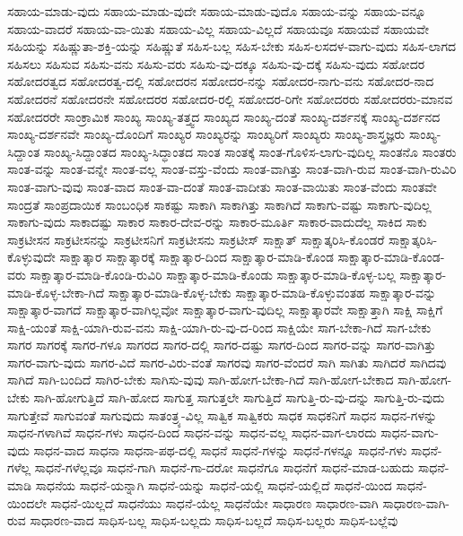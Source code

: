 {ಸಹಾಯ-ಮಾಡು-ವುದು
ಸಹಾಯ-ಮಾಡು-ವುದೇ
ಸಹಾಯ-ಮಾಡು-ವುದೊ
ಸಹಾಯ-ವನ್ನು
ಸಹಾಯ-ವನ್ನೂ
ಸಹಾಯ-ವಾದರೆ
ಸಹಾಯ-ವಾ-ಯಿತು
ಸಹಾಯ-ವಿಲ್ಲ
ಸಹಾಯ-ವಿಲ್ಲದೆ
ಸಹಾಯವೂ
ಸಹಾಯವೆ
ಸಹಾಯವೇ
ಸಹಿಯನ್ನು
ಸಹಿಷ್ಣುತಾ-ಶಕ್ತಿ-ಯನ್ನು
ಸಹಿಷ್ಣುತೆ
ಸಹಿಸ-ಬಲ್ಲ
ಸಹಿಸ-ಬೇಕು
ಸಹಿಸ-ಲಸದಳ-ವಾಗು-ವುದು
ಸಹಿಸ-ಲಾಗದ
ಸಹಿಸಲು
ಸಹಿಸುವ
ಸಹಿಸು-ವನು
ಸಹಿಸು-ವರು
ಸಹಿಸು-ವು-ದಕ್ಕೂ
ಸಹಿಸು-ವು-ದಕ್ಕೆ
ಸಹಿಸು-ವುದು
ಸಹೋದರ
ಸಹೋದರತ್ವದ
ಸಹೋದರತ್ವ-ದಲ್ಲಿ
ಸಹೋದರನ
ಸಹೋದರ-ನನ್ನು
ಸಹೋದರ-ನಾಗು-ವನು
ಸಹೋದರ-ನಾದ
ಸಹೋದರನೆ
ಸಹೋದರನೇ
ಸಹೋದರರ
ಸಹೋದರ-ರಲ್ಲಿ
ಸಹೋದರ-ರಿಗೇ
ಸಹೋದರರು
ಸಹೋದರರು-ಮಾನವ
ಸಹೋದರರೇ
ಸಾಂಕ್ರಾಮಿಕ
ಸಾಂಖ್ಯ
ಸಾಂಖ್ಯ-ತತ್ತ್ವದ
ಸಾಂಖ್ಯದ
ಸಾಂಖ್ಯ-ದಂತೆ
ಸಾಂಖ್ಯ-ದರ್ಶನಕ್ಕೆ
ಸಾಂಖ್ಯ-ದರ್ಶನದ
ಸಾಂಖ್ಯ-ದರ್ಶನವೇ
ಸಾಂಖ್ಯ-ದೊಂದಿಗೆ
ಸಾಂಖ್ಯರ
ಸಾಂಖ್ಯರನ್ನು
ಸಾಂಖ್ಯರಿಗೆ
ಸಾಂಖ್ಯರು
ಸಾಂಖ್ಯ-ಶಾಸ್ತ್ರಜ್ಞರು
ಸಾಂಖ್ಯ-ಸಿದ್ದಾಂತ
ಸಾಂಖ್ಯ-ಸಿದ್ದಾಂತದ
ಸಾಂಖ್ಯ-ಸಿದ್ಧಾಂತದ
ಸಾಂತ
ಸಾಂತಕ್ಕೆ
ಸಾಂತ-ಗೊಳಿಸ-ಲಾಗು-ವುದಿಲ್ಲ
ಸಾಂತನೊ
ಸಾಂತರು
ಸಾಂತ-ವನ್ನು
ಸಾಂತ-ವನ್ನೇ
ಸಾಂತ-ವಲ್ಲ
ಸಾಂತ-ವಸ್ತು-ವೆಂದು
ಸಾಂತ-ವಾಗಿತ್ತು
ಸಾಂತ-ವಾಗಿ-ರುವ
ಸಾಂತ-ವಾಗಿ-ರುವಿರಿ
ಸಾಂತ-ವಾಗು-ವುವು
ಸಾಂತ-ವಾದ
ಸಾಂತ-ವಾ-ದಂತೆ
ಸಾಂತ-ವಾದೀತು
ಸಾಂತ-ವಾಯಿತು
ಸಾಂತ-ವೆಂದು
ಸಾಂತವೇ
ಸಾಂದ್ರತೆ
ಸಾಂಪ್ರದಾಯಿಕ
ಸಾಂಬಂಧಿಕ
ಸಾಕಷ್ಟು
ಸಾಕಾಗಿ
ಸಾಕಾಗಿತ್ತು
ಸಾಕಾಗಿದೆ
ಸಾಕಾಗು-ವಷ್ಟು
ಸಾಕಾಗು-ವುದಿಲ್ಲ
ಸಾಕಾಗು-ವುದು
ಸಾಕಾದಷ್ಟು
ಸಾಕಾರ
ಸಾಕಾರ-ದೇವ-ರನ್ನು
ಸಾಕಾರ-ಮೂರ್ತಿ
ಸಾಕಾರ-ವಾದುದೆಲ್ಲ
ಸಾಕಿದ
ಸಾಕು
ಸಾಕ್ರಟೀಸನ
ಸಾಕ್ರಟೀಸನನ್ನು
ಸಾಕ್ರಟೀಸನಿಗೆ
ಸಾಕ್ರಟೀಸನು
ಸಾಕ್ರಟೀಸ್
ಸಾಕ್ಷಾತ್
ಸಾಕ್ಷಾತ್ಕರಿಸಿ-ಕೊಂಡರೆ
ಸಾಕ್ಷಾತ್ಕರಿಸಿ-ಕೊಳ್ಳುವುದೇ
ಸಾಕ್ಷಾತ್ಕಾರ
ಸಾಕ್ಷಾತ್ಕಾರಕ್ಕೆ
ಸಾಕ್ಷಾತ್ಕಾರ-ದಿಂದ
ಸಾಕ್ಷಾತ್ಕಾರ-ಮಾಡಿ-ಕೊಂಡ
ಸಾಕ್ಷಾತ್ಕಾರ-ಮಾಡಿ-ಕೊಂಡ-ವರು
ಸಾಕ್ಷಾತ್ಕಾರ-ಮಾಡಿ-ಕೊಂಡಿ-ರುವಿರಿ
ಸಾಕ್ಷಾತ್ಕಾರ-ಮಾಡಿ-ಕೊಂಡು
ಸಾಕ್ಷಾತ್ಕಾರ-ಮಾಡಿ-ಕೊಳ್ಳ-ಬಲ್ಲ
ಸಾಕ್ಷಾತ್ಕಾರ-ಮಾಡಿ-ಕೊಳ್ಳ-ಬೇಕಾ-ಗಿದೆ
ಸಾಕ್ಷಾತ್ಕಾರ-ಮಾಡಿ-ಕೊಳ್ಳ-ಬೇಕು
ಸಾಕ್ಷಾತ್ಕಾರ-ಮಾಡಿ-ಕೊಳ್ಳುವಂತಹ
ಸಾಕ್ಷಾತ್ಕಾರ-ವನ್ನು
ಸಾಕ್ಷಾತ್ಕಾರ-ವಾಗದೆ
ಸಾಕ್ಷಾತ್ಕಾರ-ವಾಗಿಲ್ಲವೋ
ಸಾಕ್ಷಾತ್ಕಾರ-ವಾಗು-ವುದಿಲ್ಲ
ಸಾಕ್ಷಾತ್ಕಾರವೇ
ಸಾಕ್ಷಾತ್ತಾಗಿ
ಸಾಕ್ಷಿ
ಸಾಕ್ಷಿಗೆ
ಸಾಕ್ಷಿ-ಯಂತೆ
ಸಾಕ್ಷಿ-ಯಾಗಿ-ರುವ-ವನು
ಸಾಕ್ಷಿ-ಯಾಗಿ-ರು-ವು-ದ-ರಿಂದ
ಸಾಕ್ಷಿಯೇ
ಸಾಗ-ಬೇಕಾ-ಗಿದೆ
ಸಾಗ-ಬೇಕು
ಸಾಗರ
ಸಾಗರಕ್ಕೆ
ಸಾಗರ-ಗಳೂ
ಸಾಗರದ
ಸಾಗರ-ದಲ್ಲಿ
ಸಾಗರ-ದಷ್ಟು
ಸಾಗರ-ದಿಂದ
ಸಾಗರ-ವನ್ನು
ಸಾಗರ-ವಾಗಿತ್ತು
ಸಾಗರ-ವಾಗು-ವುದು
ಸಾಗರ-ವಿದೆ
ಸಾಗರ-ವಿರು-ವಂತೆ
ಸಾಗರವು
ಸಾಗರ-ವೆಂದರೆ
ಸಾಗಿ
ಸಾಗಿತು
ಸಾಗಿದರೆ
ಸಾಗಿದವು
ಸಾಗಿದೆ
ಸಾಗಿ-ಬಂದಿದೆ
ಸಾಗಿರ-ಬೇಕು
ಸಾಗಿಸು-ವುವು
ಸಾಗಿ-ಹೋಗ-ಬೇಕಾ-ಗಿದೆ
ಸಾಗಿ-ಹೋಗ-ಬೇಕಾದ
ಸಾಗಿ-ಹೋಗ-ಬೇಕು
ಸಾಗಿ-ಹೋಗುತ್ತಿದೆ
ಸಾಗಿ-ಹೋದ
ಸಾಗುತ್ತ
ಸಾಗುತ್ತಲೇ
ಸಾಗುತ್ತಿದೆ
ಸಾಗುತ್ತಿ-ರು-ವು-ದನ್ನು
ಸಾಗುತ್ತಿ-ರು-ವುದು
ಸಾಗುತ್ತೇವೆ
ಸಾಗುವಂತೆ
ಸಾಗುವುದು
ಸಾತಂತ್ರ್ಯ-ವಿಲ್ಲ
ಸಾತ್ವಿಕ
ಸಾತ್ವಿಕರು
ಸಾಧಕ
ಸಾಧಕನಿಗೆ
ಸಾಧನ
ಸಾಧನ-ಗಳನ್ನು
ಸಾಧನ-ಗಳಾಗಿವೆ
ಸಾಧನ-ಗಳು
ಸಾಧನ-ದಿಂದ
ಸಾಧನ-ವನ್ನು
ಸಾಧನ-ವಲ್ಲ
ಸಾಧನ-ವಾಗ-ಲಾರದು
ಸಾಧನ-ವಾಗು-ವುದು
ಸಾಧನ-ವಾದ
ಸಾಧನಾ
ಸಾಧನಾ-ಪಥ-ದಲ್ಲಿ
ಸಾಧನೆ
ಸಾಧನೆ-ಗಳನ್ನು
ಸಾಧನೆ-ಗಳನ್ನೂ
ಸಾಧನೆ-ಗಳು
ಸಾಧನೆ-ಗಳೆಲ್ಲ
ಸಾಧನೆ-ಗಳೆಲ್ಲವೂ
ಸಾಧನೆ-ಗಾಗಿ
ಸಾಧನೆ-ಗಾ-ದರೋ
ಸಾಧನೆಗೂ
ಸಾಧನೆಗೆ
ಸಾಧನೆ-ಮಾಡ-ಬಹುದು
ಸಾಧನೆ-ಮಾಡಿ
ಸಾಧನೆಯ
ಸಾಧನೆ-ಯನ್ನಾಗಿ
ಸಾಧನೆ-ಯನ್ನು
ಸಾಧನೆ-ಯಲ್ಲಿ
ಸಾಧನೆ-ಯಲ್ಲಿದೆ
ಸಾಧನೆ-ಯಿಂದ
ಸಾಧನೆ-ಯಿಂದಲೇ
ಸಾಧನೆ-ಯಿಲ್ಲದೆ
ಸಾಧನೆಯು
ಸಾಧನೆ-ಯೆಲ್ಲ
ಸಾಧನೆಯೇ
ಸಾಧಾರಣ
ಸಾಧಾರಣ-ವಾಗಿ
ಸಾಧಾರಣ-ವಾಗಿ-ರುವ
ಸಾಧಾರಣ-ವಾದ
ಸಾಧಿಸ-ಬಲ್ಲ
ಸಾಧಿಸ-ಬಲ್ಲದು
ಸಾಧಿಸ-ಬಲ್ಲದೆ
ಸಾಧಿಸ-ಬಲ್ಲರು
ಸಾಧಿಸ-ಬಲ್ಲೆವು
}
